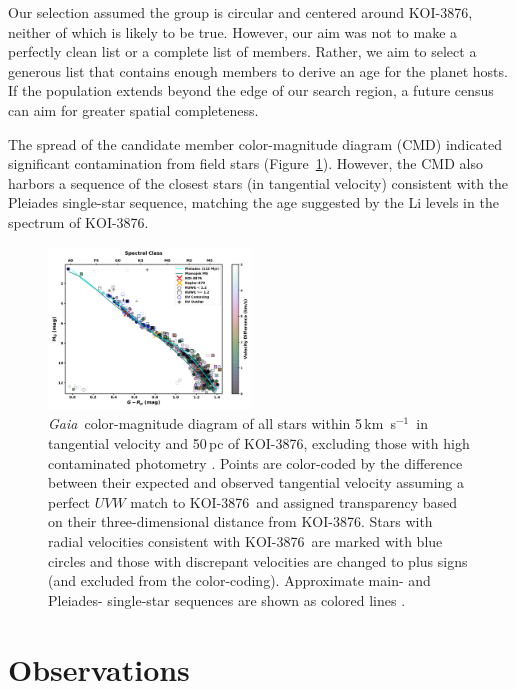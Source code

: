 \documentclass[twocolumn, linenumbers]{aastex631}
\newcommand{\starname}{KOI-3876}
\newcommand\kms{km~s$^{-1}$}
\newcommand{\gaia}{\textit{Gaia}}
\begin{document}
Our selection assumed the group is circular and centered around \starname, neither of which is likely to be true. However, our aim was not to make a perfectly clean list or a complete list of members. Rather, we aim to select a generous list that contains enough members to derive an age for the planet hosts. If the population extends beyond the edge of our search region, a future census can aim for greater spatial completeness. 

The spread of the candidate member color-magnitude diagram (CMD) indicated significant contamination from field stars (Figure~\ref{fig:CMD}). However, the CMD also harbors a sequence of the closest stars (in tangential velocity) consistent with the Pleiades single-star sequence, matching the age suggested by the Li levels in the spectrum of \starname.\newline\newline

\begin{figure}[tbh]
    \centering
    \includegraphics[width=0.48\textwidth]{KOI-3876cmd.pdf}
    \caption{\gaia\ color-magnitude diagram of all stars within 5\,\kms\ in tangential velocity and 50\,pc of \starname, excluding those with high contaminated photometry \citep{EDR3photometry}. Points are color-coded by the difference between their expected and observed tangential velocity assuming a perfect $UVW$ match to \starname\ and assigned transparency based on their three-dimensional distance from \starname. Stars with radial velocities consistent with \starname\ are marked with blue circles and those with discrepant velocities are changed to plus signs (and excluded from the color-coding). Approximate main- and Pleiades- single-star sequences are shown as colored lines \citep{2013ApJS..208....9P, 2019A&A...628A..66L}.  }
    \label{fig:CMD}
\end{figure} 


\section{Observations}\label{sec:obs}
\end{document}
